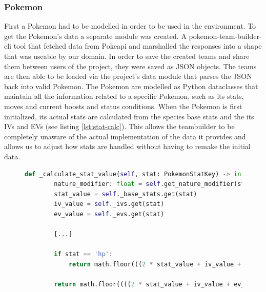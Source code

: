\subsubsection{Pokemon}
First a Pokemon had to be modelled in order to be used in the environment.
To get the Pokemon's data a separate module was created. A pokemon-team-builder-cli \cite{TeambuilderCli} tool that
fetched data from Pokeapi \cite{PokeAPI} and marshalled the responses into a shape that was useable by our domain.
In order to save the created teams and share them between users of the project, they were saved as JSON objects.
The teams are then able to be loaded via the project's data module that parses the JSON back into valid Pokemon.
The Pokemon are modelled as Python dataclasses that maintain all the information related to a specific Pokemon, such as
its stats, moves and current boosts and status conditions. When the Pokemon is first initialized, its actual stats
are calculated from the species base stats and the its IVs and EVs (see listing \ref{lst:stat-calc}). This allows the teambuilder to be
completely unaware of the actual implementation of the data it provides and allows us to adjust how stats are handled
without having to remake the initial data.

\begin{figure}[h]
    \centering
    \begin{lstlisting}[basicstyle=\fontsize{10}{10}\selectfont\ttfamily,language=Python,caption={Function for calculating a Pokemon's stats.},label=lst:stat-calc,breaklines]
    def _calculate_stat_value(self, stat: PokemonStatKey) -> int:
        nature_modifier: float = self.get_nature_modifier(stat)
        stat_value = self._base_stats.get(stat)
        iv_value = self._ivs.get(stat)
        ev_value = self._evs.get(stat)
    
        [...]
    
        if stat == 'hp':
            return math.floor(((2 * stat_value + iv_value + ev_value // 4) * self.level // 100) + self.level + 10)
            
        return math.floor((((2 * stat_value + iv_value + ev_value // 4) * self.level // 100) + 5) * nature_modifier)
    \end{lstlisting}
\end{figure}

